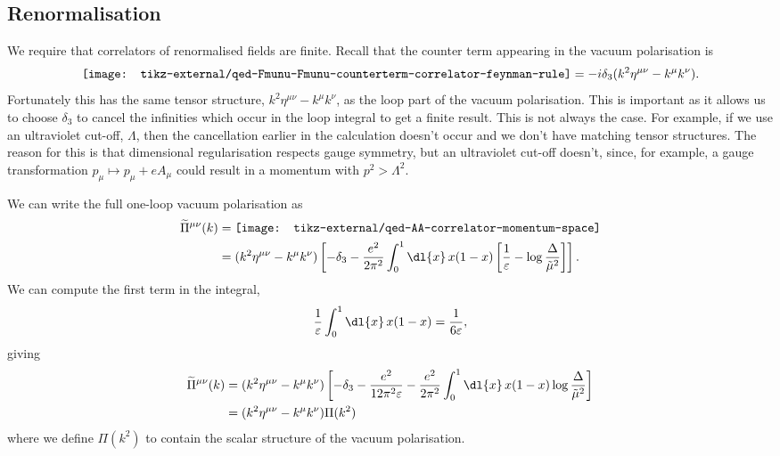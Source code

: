 \documentclass[fleqn]{NotesClass}
\newcommand{\minkowskiMetric}{\eta}
\begin{document}
    \subsection{Renormalisation}
    We require that correlators of renormalised fields are finite.
    Recall that the counter term appearing in the vacuum polarisation is
    \begin{equation}
        \vcenter{\hbox{\texttt{[image: tikz-external/qed-Fmunu-Fmunu-counterterm-correlator-feynman-rule]}}} = -i\delta_3(k^2\minkowskiMetric^{\mu\nu} - k^\mu k^\nu).
    \end{equation}
    Fortunately this has the same tensor structure, \(k^2 \minkowskiMetric^{\mu\nu} - k^\mu k^\nu\), as the loop part of the vacuum polarisation.
    This is important as it allows us to choose \(\delta_3\) to cancel the infinities which occur in the loop integral to get a finite result.
    This is not always the case.
    For example, if we use an ultraviolet cut-off, \(\Lambda\), then the cancellation earlier in the calculation doesn't occur and we don't have matching tensor structures.
    The reason for this is that dimensional regularisation respects gauge symmetry, but an ultraviolet cut-off doesn't, since, for example, a gauge transformation \(p_\mu \mapsto p_\mu + eA_\mu\) could result in a momentum with \(p^2 > \Lambda^2\).
    
    We can write the full one-loop vacuum polarisation as
    \begin{align}
        \widetilde{\Pi}^{\mu\nu}(k) &= 
        \vcenter{\hbox{\texttt{[image: tikz-external/qed-AA-correlator-momentum-space]}}}\\
        &= (k^2 \minkowskiMetric^{\mu\nu} - k^\mu k^\nu) \left[ -\delta_3 - \frac{e^2}{2\pi^2} \int_0^1 \dl{x} \, x(1 - x)\left[ \frac{1}{\varepsilon} - \log \frac{\Delta}{\tilde{\mu}^2} \right] \right].\notag
    \end{align}
    We can compute the first term in the integral,
    \begin{equation}
        \frac{1}{\varepsilon} \int_0^1 \dl{x} \, x(1 - x) = \frac{1}{6\varepsilon},
    \end{equation}
    giving
    \begin{align}
        \widetilde{\Pi}^{\mu\nu}(k) &= (k^2 \minkowskiMetric^{\mu\nu} - k^\mu k^\nu) \left[ -\delta_3 - \frac{e^2}{12\pi^2\varepsilon} - \frac{e^2}{2\pi^2} \int_0^1 \dl{x} \, x(1 - x) \log\frac{\Delta}{\tilde{\mu}^2} \right] \notag\\
        &= (k^2 \minkowskiMetric^{\mu\nu} - k^\mu k^\nu) \Pi(k^2)
    \end{align}
    where we define \(\Pi(k^2)\) to contain the scalar structure of the vacuum polarisation.
    
\end{document}
